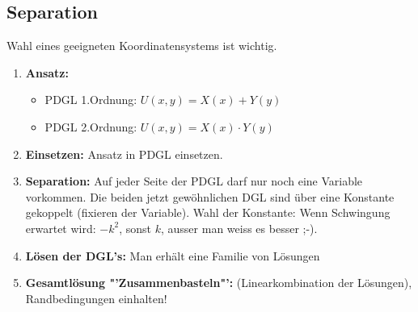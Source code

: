 \subsection{Separation}
Wahl eines geeigneten Koordinatensystems ist wichtig.


\begin{enumerate}
\item \textbf{Ansatz: }
	\begin{itemize}
		\item PDGL 1.Ordnung: $U(x,y)=X(x) + Y(y)$
		\item PDGL 2.Ordnung: $U(x,y)=X(x) \cdot Y(y)$ 
	\end{itemize}
\item \textbf{Einsetzen: } Ansatz in PDGL einsetzen.
\item \textbf{Separation: } Auf jeder Seite der PDGL darf nur noch eine Variable vorkommen. Die beiden jetzt gewöhnlichen DGL sind über eine Konstante gekoppelt (fixieren der Variable). Wahl der Konstante: Wenn Schwingung erwartet wird: $-k^2$, sonst $k$, ausser man weiss es besser ;-).
\item \textbf{Lösen der DGL's: } Man erhält eine Familie von Lösungen	
\item \textbf{Gesamtlösung "'Zusammenbasteln"': } (Linearkombination der Lösungen), Randbedingungen einhalten!
\end{enumerate}

